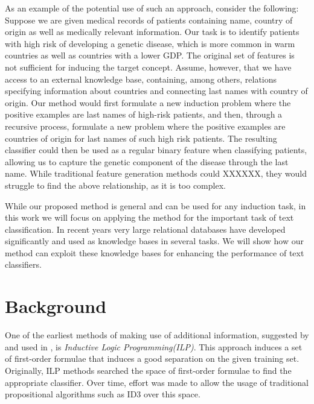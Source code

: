 \documentclass[letterpaper]{article}
\theoremstyle{definition}
\begin{document}
As an example of the potential use of such an approach, consider the following:
Suppose we are given medical records of patients containing name, country of origin as well as medically relevant information.
Our task is to identify patients with high risk of developing a genetic disease, which is more common in warm countries as well as countries with a lower GDP.
The original set of features is not sufficient for inducing the target concept.  Assume, however, that we have access to an external knowledge base, containing, among others, relations specifying information about countries and connecting last names with country of origin.
Our method would first formulate a new induction problem where the positive examples are last names of high-risk patients, and then, through a recursive process, formulate a new problem where the positive examples are countries of origin for last names of such high risk patients. The resulting classifier could then be used as a regular binary feature when classifying patients, allowing us to capture the genetic component of the disease through the last name.
While traditional feature generation methods could XXXXXX, they would struggle to find the above relationship, as it is too complex.


While our proposed method is general and can be used for any induction task, in this work we will focus on applying the method for the important task of text classification. In recent years very large relational databases have developed significantly and used as knowledge bases in several tasks. We will show how our method can exploit these knowledge bases for enhancing the performance of text classifiers.

\section{Background} \label{background}
One of the earliest methods of making use of additional information, suggested by \cite{muggleton1991inductive} and used in \cite{quinlan1990learning}, is \emph{Inductive Logic Programming(ILP)}. This approach induces a set of first-order formulae
that induces a good separation on the given training set. Originally, ILP methods searched the space of first-order formulae to find the appropriate classifier.
Over time, effort was made to allow the usage of traditional propositional algorithms such as ID3\cite{quinlan1986} over this space.
\end{document}

